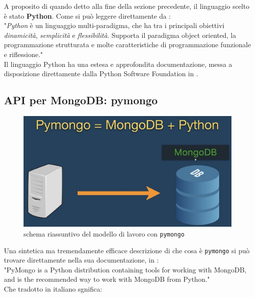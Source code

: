     A proposito di quando detto alla fine della sezione precedente, il linguaggio scelto è stato \textbf{Python}. Come si può leggere direttamente da \cite{pywiki}:\\

    "\textit{Python} è un linguaggio multi-paradigma, che ha tra i principali obiettivi \textit{dinamicità}, \textit{semplicità} e \textit{flessibilità}. Supporta il paradigma object oriented, la programmazione strutturata e molte caratteristiche di programmazione funzionale e riflessione." \\

    Il linguaggio Python ha una estesa e approfondita documentazione, messa a disposizione direttamente dalla Python Software Foundation in \cite{python}.

    \subsection{API per MongoDB: pymongo}

        \begin{figure}
            \centering
            \caption{schema riassuntivo del modello di lavoro con \texttt{pymongo}}
            \label{pymongo_logo}
    	    \includegraphics[scale=0.75]{img/pymongo.png}
        \end{figure}

        Una sintetica ma tremendamente efficace descrizione di che cosa è \texttt{pymongo} si può trovare direttamente nella sua documentazione, in \cite{pymongo}:\\

        "PyMongo is a Python distribution containing tools for working with MongoDB, and is the recommended way to work with MongoDB from Python." \\

        Che tradotto in italiano sgnifica: \\

